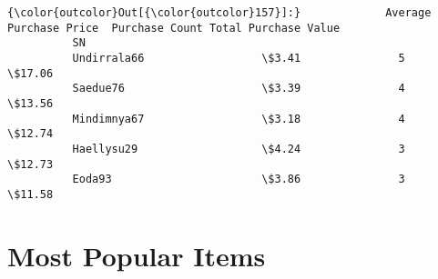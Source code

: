 \documentclass[11pt]{article}
\begin{document}
\begin{Verbatim}[commandchars=\\\{\}]
{\color{outcolor}Out[{\color{outcolor}157}]:}             Average Purchase Price  Purchase Count Total Purchase Value
          SN                                                                     
          Undirrala66                  \$3.41               5               \$17.06
          Saedue76                     \$3.39               4               \$13.56
          Mindimnya67                  \$3.18               4               \$12.74
          Haellysu29                   \$4.24               3               \$12.73
          Eoda93                       \$3.86               3               \$11.58
\end{Verbatim}
            
    \section{Most Popular Items}\label{most-popular-items}
\end{document}
